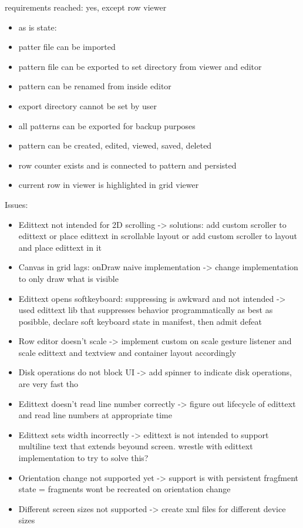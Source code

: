 requirements reached:
yes, except row viewer

\begin{itemize}
\item as is state:
\item patter file can be imported
\item pattern file can be exported to set directory from viewer and editor
\item pattern can be renamed from inside editor
\item export directory cannot be set by user
\item all patterns can be exported for backup purposes
\item pattern can be created, edited, viewed, saved, deleted
\item row counter exists and is connected to pattern and persisted
\item current row in viewer is highlighted in grid viewer
\end{itemize}

Issues:
\begin{itemize}
\item Edittext not intended for 2D scrolling
-> solutions: 
	add custom scroller to edittext or place edittext in scrollable layout or add custom scroller to layout and place edittext in it
\item Canvas in grid lags: onDraw naive implementation
-> change implementation to only draw what is visible
\item Edittext opens softkeyboard: suppressing is awkward and not intended
-> used edittext lib that suppresses behavior programmatically as best as posibble, declare soft keyboard state in manifest, then admit defeat
\item Row editor doesn’t scale
-> implement custom on scale gesture listener and scale edittext and textview and container layout accordingly
\item Disk operations do not block UI
-> add spinner to indicate disk operations, are very fast tho
\item Edittext doesn’t read line number correctly
-> figure out lifecycle of edittext and read line numbers at appropriate time
\item Edittext sets width incorrectly
-> edittext is not intended to support multiline text that extends beyound screen. wrestle with edittext implementation to try to solve this?
\item Orientation change not supported yet
-> support is with persistent fragfment state = fragments wont be recreated on orientation change
\item Different screen sizes not supported
-> create xml files for different device sizes
\end{itemize}


